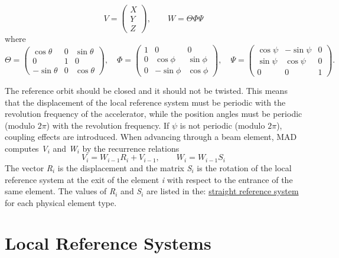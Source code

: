 \[
V =
 \begin{pmatrix}
  X \\
  Y \\
  Z
 \end{pmatrix}
, \qquad
W=\Theta \Phi \Psi
\]
 where 
\[
\Theta =
 \begin{pmatrix}
  \cos \theta  & 0 &  \sin \theta \\
  0            & 1 &  0 \\
  -\sin \theta & 0 &  \cos \theta
 \end{pmatrix}
, \quad
\Phi =
 \begin{pmatrix}
  1 & 0          &  0 \\
  0 & \cos \phi  &  \sin \phi \\
  0 & -\sin \phi &  \cos \phi
 \end{pmatrix}
, \quad
\Psi =
 \begin{pmatrix}
  \cos \psi &  -\sin \psi & 0 \\
  \sin \psi &  \cos \psi  & 0 \\
  0	    &	0	  & 1 
 \end{pmatrix}
.
\]

The reference orbit should be closed and it should not be twisted. This
means that the displacement of the local reference system must be
periodic with the revolution frequency of the accelerator, while the
position angles must be periodic (modulo \(2\pi\)) with the revolution
frequency. If $\psi$ is not periodic (modulo $2\pi$), coupling effects are
introduced. 
When advancing through a beam element, MAD computes
\textit{V$_i$} and \textit{W$_i$} by the recurrence relations  
\[
   V_{i}=W_{i-1}R_{i}+V_{i-1},
   \qquad
   W_{i}=W_{i-1}S_{i}
\]
The vector \textit{R$_i$} is the displacement and the matrix
\textit{S$_i$} is the rotation of the local reference system  at the
exit of the element \textit{i} with respect to the entrance  of the same
element. The values of \textit{R$_i$} and \textit{S$_i$} are listed in
the:   \href{local_system.html#straight}{straight reference system} for
each physical element type.  




\section{Local Reference Systems}
\label{sec:local_ref}

